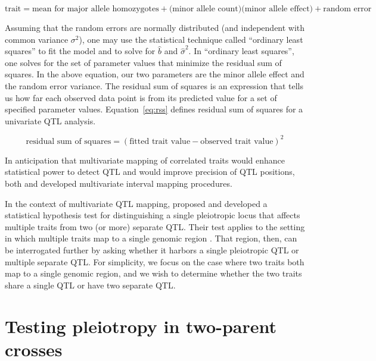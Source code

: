 \documentclass[oneside]{book}\usepackage[]{graphicx}\usepackage[]{color}
\begin{document}
\begin{equation}
\text{trait} = \text{mean for major allele homozygotes} + \text{(minor allele count)}\text{(minor allele effect)} + \text{random error}
\label{eq:uni-2-parent}
\end{equation}

Assuming that the random errors are normally distributed (and independent with common
variance $\sigma^2$), one may use the statistical technique called ``ordinary least squares''
to fit the model and to solve for $\hat b$ and $\hat \sigma^2$.
In ``ordinary least squares'', one solves for the set of parameter values that
minimize the residual sum of squares. In the above equation, our two parameters are the minor allele effect and the random error variance. The residual sum of squares is an expression that tells us how far each observed data point is from its predicted value for a set of specified parameter values. Equation~\ref{eq:rss} defines residual sum of squares for a univariate QTL analysis.

\begin{equation}
\text{residual sum of squares} = \left(\text{fitted trait value} - \text{observed trait value}\right)^2\label{eq:rss}
\end{equation}




In anticipation that multivariate mapping of correlated traits would enhance statistical
power to detect QTL and would improve precision of QTL positions,
both \citet{jiang1995multiple} and \citet{korol1995interval} developed
multivariate interval mapping procedures. 





In the context of multivariate QTL mapping, \citet{jiang1995multiple} 
proposed and developed a statistical hypothesis test for distinguishing
a single pleiotropic locus that affects multiple traits from two (or more)
separate QTL.
Their test applies to the setting in which multiple traits
map to a single genomic region \citep{jiang1995multiple}. 
That region, then, can be interrogated further by asking whether it
harbors a single pleiotropic QTL or multiple separate QTL. 
For simplicity, we focus on the case where two traits both map to a single genomic region,
and we wish to determine whether the two traits share a single QTL or have two separate QTL. 

\section{Testing pleiotropy in two-parent crosses}
\end{document}
